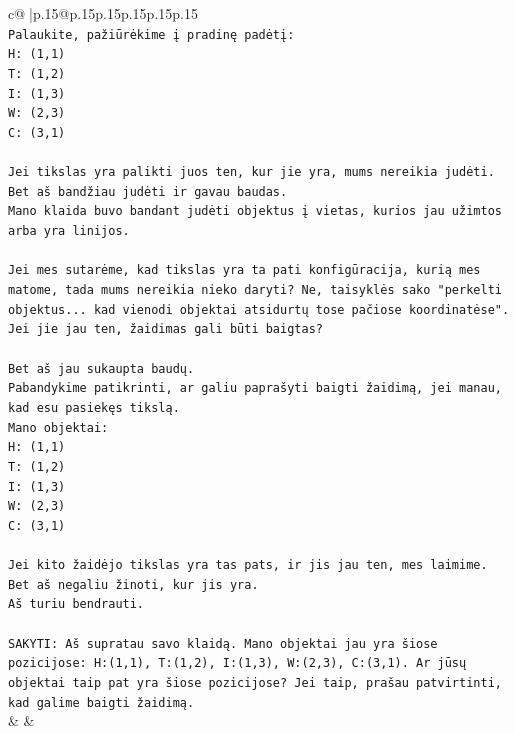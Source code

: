 \documentclass{article}
\begin{document}
{\begin{supertabular}{c@{$\;$}|p{.15\linewidth}@{}p{.15\linewidth}p{.15\linewidth}p{.15\linewidth}p{.15\linewidth}p{.15\linewidth}}
{{{\\ 
\texttt{Palaukite, pažiūrėkime į pradinę padėtį:} \\
\texttt{H: (1,1)} \\
\texttt{T: (1,2)} \\
\texttt{I: (1,3)} \\
\texttt{W: (2,3)} \\
\texttt{C: (3,1)} \\
\\ 
\texttt{Jei tikslas yra palikti juos ten, kur jie yra, mums nereikia judėti. Bet aš bandžiau judėti ir gavau baudas.} \\
\texttt{Mano klaida buvo bandant judėti objektus į vietas, kurios jau užimtos arba yra linijos.} \\
\\ 
\texttt{Jei mes sutarėme, kad tikslas yra ta pati konfigūracija, kurią mes matome, tada mums nereikia nieko daryti? Ne, taisyklės sako "perkelti objektus... kad vienodi objektai atsidurtų tose pačiose koordinatėse". Jei jie jau ten, žaidimas gali būti baigtas?} \\
\\ 
\texttt{Bet aš jau sukaupta baudų.} \\
\texttt{Pabandykime patikrinti, ar galiu paprašyti baigti žaidimą, jei manau, kad esu pasiekęs tikslą.} \\
\texttt{Mano objektai:} \\
\texttt{H: (1,1)} \\
\texttt{T: (1,2)} \\
\texttt{I: (1,3)} \\
\texttt{W: (2,3)} \\
\texttt{C: (3,1)} \\
\\ 
\texttt{Jei kito žaidėjo tikslas yra tas pats, ir jis jau ten, mes laimime.} \\
\texttt{Bet aš negaliu žinoti, kur jis yra.} \\
\texttt{Aš turiu bendrauti.} \\
\\ 
\texttt{SAKYTI: Aš supratau savo klaidą. Mano objektai jau yra šiose pozicijose: H:(1,1), T:(1,2), I:(1,3), W:(2,3), C:(3,1). Ar jūsų objektai taip pat yra šiose pozicijose? Jei taip, prašau patvirtinti, kad galime baigti žaidimą.} \\
            }
        }
    }
    & & \\ \\


\end{supertabular}}
\end{document}
